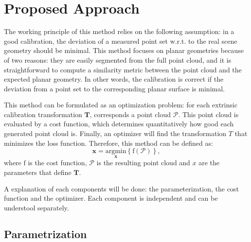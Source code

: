 \documentclass[conference]{IEEEtran}
\begin{document}
\section{Proposed Approach}
\label{section:proposed_approach}

The working principle of this method relies on the following assumption: in a good calibration, the deviation of a measured point set w.r.t. to the real scene geometry should be minimal. This method focuses on planar geometries because of two reasons: they are easily segmented from the full point cloud, and it is straightforward to compute a similarity metric between the point cloud and the expected planar geometry. In other words, the calibration is correct if the deviation from a point set to the corresponding planar surface is minimal.

This method can be formulated as an optimization problem: for each extrinsic calibration transformation $\mathbf{T}$, corresponds a point cloud $\mathcal{P}$. This point cloud is evaluated by a cost function, which determines quantitatively how good each generated point cloud is. Finally, an optimizer will find the transformation $T$ that minimizes the loss function. Therefore, this method can be defined as:
%
\begin{equation}
    \mathbf{\mathbf{x}} = \underset{\mathbf{x}}{\mathrm{argmin}} \left\{ \mathrm{f}(\mathcal{P}) \right\},
\end{equation}
%
\noindent where $\mathrm{f}$ is the cost function, $\mathcal{P}$ is the resulting point cloud and $x$ are the parameters that define $\mathbf{T}$.

A explanation of each components will be done: the parameterization, the cost function and the optimizer. Each component is independent and can be understool separately.

\subsection{Parametrization}
\end{document}
